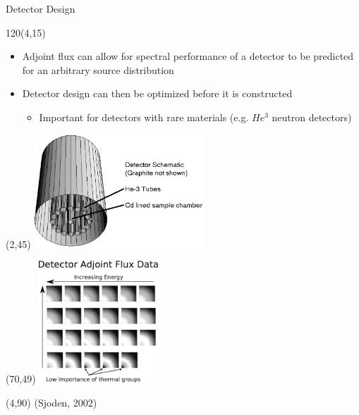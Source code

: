\documentclass{beamer}
\begin{document}
\begin{frame}{Detector Design}
  
  \begin{textblock}{120}(4,15)
    \begin{itemize}
      \item Adjoint flux can allow for spectral performance of a detector to be 
        predicted for an arbitrary source distribution
        \medskip
      \item Detector design can then be optimized before it is constructed
        \smallskip
        \begin{itemize}
          \item Important for detectors with rare materials (e.g. $He^3$ 
            neutron detectors)
        \end{itemize}
    \end{itemize}
  \end{textblock}

  \begin{textblock}{20}(2,45)
    \includegraphics[width=2.5in]{figures/He3_detector.png}
  \end{textblock}

  \begin{textblock}{20}(70,49)
    \includegraphics[width=1.8in]{figures/He3_detector_adjoint_data_modified.pdf}
  \end{textblock}

  \begin{textblock}{50}(4,90)
    (Sjoden, 2002)
  \end{textblock}

\end{frame}
\end{document}
